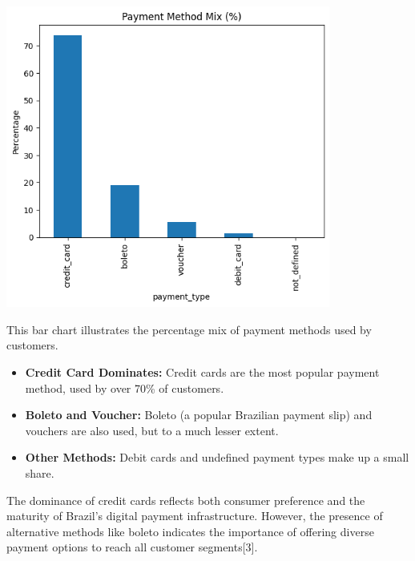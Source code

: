 \documentclass[a4paper]{article}
\begin{document}
\begin{multicols}{2}
\vspace{1em}

\noindent
\begin{minipage}{\columnwidth}
\centering
\includegraphics[width=0.8\textwidth]{plots/Payment Method Mix.png}
\label{fig:payment_method_mix}
\end{minipage}

This bar chart illustrates the percentage mix of payment methods used by customers.

\begin{itemize}
    \item \textbf{Credit Card Dominates:} Credit cards are the most popular payment method, used by over 70\% of customers.
    \item \textbf{Boleto and Voucher:} Boleto (a popular Brazilian payment slip) and vouchers are also used, but to a much lesser extent.
    \item \textbf{Other Methods:} Debit cards and undefined payment types make up a small share.
\end{itemize}

The dominance of credit cards reflects both consumer preference and the maturity of Brazil’s digital payment infrastructure. However, the presence of alternative methods like boleto indicates the importance of offering diverse payment options to reach all customer segments[3].

\vspace{1em}


\end{multicols}
\end{document}
